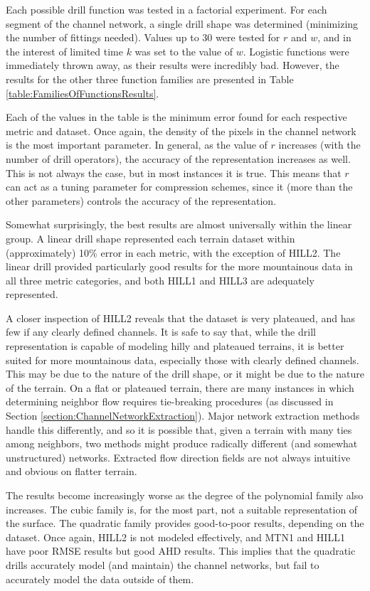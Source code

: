 Each possible drill function was tested in a factorial experiment. For each segment of the channel network, a single drill shape was determined (minimizing the number of fittings needed). Values up to 30 were tested for $r$ and $w$, and in the interest of limited time $k$ was set to the value of $w$. Logistic functions were immediately thrown away, as their results were incredibly bad. However, the results for the other three function families are presented in Table \ref{table:FamiliesOfFunctionsResults}.

Each of the values in the table is the minimum error found for each respective metric and dataset. Once again, the density of the pixels in the channel network is the most important parameter. In general, as the value of $r$ increases (with the number of drill operators), the accuracy of the representation increases as well. This is not always the case, but in most instances it is true. This means that $r$ can act as a tuning parameter for compression schemes, since it (more than the other parameters) controls the accuracy of the representation.

Somewhat surprisingly, the best results are almost universally within the linear group. A linear drill shape represented each terrain dataset within (approximately) 10\% error in each metric, with the exception of HILL2. The linear drill provided particularly good results for the more mountainous data in all three metric categories, and both HILL1 and HILL3 are adequately represented.

A closer inspection of HILL2 reveals that the dataset is very plateaued, and has few if any clearly defined channels. It is safe to say that, while the drill representation is capable of modeling hilly and plateaued terrains, it is better suited for more mountainous data, especially those with clearly defined channels. This may be due to the nature of the drill shape, or it might be due to the nature of the terrain. 
On a flat or plateaued terrain, there are many instances in which determining neighbor flow requires tie-breaking procedures (as discussed in Section \ref{section:ChannelNetworkExtraction}). Major network extraction methods handle this differently, and so it is possible that, given a terrain with many ties among neighbors, two methods might produce radically different (and somewhat unstructured) networks. 
Extracted flow direction fields are not always intuitive and obvious on flatter terrain.

The results become increasingly worse as the degree of the polynomial family also increases. The cubic family is, for the most part, not a suitable representation of the surface. The quadratic family provides good-to-poor results, depending on the dataset. Once again, HILL2 is not modeled effectively, and MTN1 and HILL1 have poor RMSE results but good AHD results. This implies that the quadratic drills accurately model (and maintain) the channel networks, but fail to accurately model the data outside of them. 

